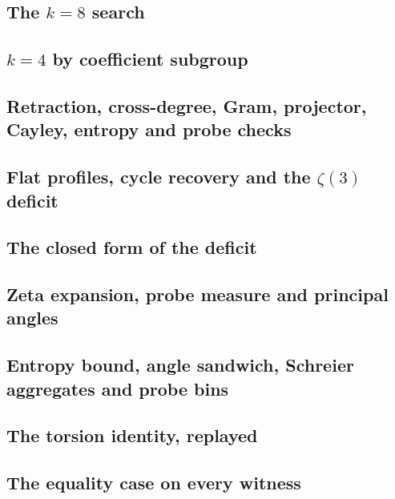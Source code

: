 \documentclass[11pt]{article}
\theoremstyle{remark}\newtheorem{remark}[theorem]{Remark}
\begin{document}
\subsection*{The \texorpdfstring{$k=8$}{k=8} search}

\subsection*{\texorpdfstring{$k=4$}{k=4} by coefficient subgroup}

\subsection*{Retraction, cross-degree, Gram, projector, Cayley, entropy and probe checks}

\subsection*{Flat profiles, cycle recovery and the \texorpdfstring{$\zeta(3)$}{zeta(3)} deficit}

\subsection*{The closed form of the deficit}

\subsection*{Zeta expansion, probe measure and principal angles}

\subsection*{Entropy bound, angle sandwich, Schreier aggregates and probe bins}

\subsection*{The torsion identity, replayed}

\subsection*{The equality case on every witness}

\end{document}
